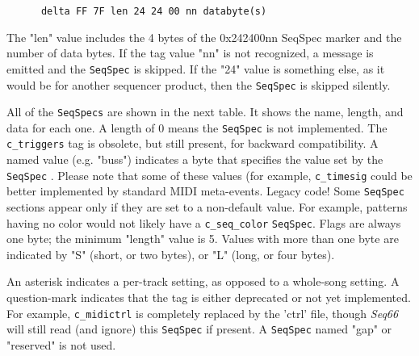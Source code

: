    \begin{verbatim}
      delta FF 7F len 24 24 00 nn databyte(s)
   \end{verbatim}

   The "len" value includes the 4 bytes of the 0x242400nn
   SeqSpec marker and the number of data bytes.
   If the tag value "nn" is not recognized, a message is emitted and the
   \texttt{SeqSpec} is skipped.  If the "24" value is something else, as it
   would be for another sequencer product, then the
   \texttt{SeqSpec} is skipped silently.

   All of the
   \texttt{SeqSpecs} are shown in the next table. It shows the name, length,
   and data for each one. A length of 0 means the
   \texttt{SeqSpec} is not implemented.
   The \texttt{c\_triggers} tag is obsolete, but still present, for
   backward compatibility.
   A named value (e.g. "buss") indicates a byte that specifies the value set by
   the \texttt{SeqSpec} .
   Please note that some of these values (for example, \texttt{c\_timesig}
   could be better implemented by standard MIDI meta-events. Legacy code!
   Some \texttt{SeqSpec} sections appear only if they are set to a non-default
   value.
   For example, patterns having no color would not likely have a
   \texttt{c\_seq\_color} \texttt{SeqSpec}.
   Flags are always one byte; the minimum "length" value is 5.
   Values with more than one byte are indicated by "S" (short, or two bytes),
   or "L" (long, or four bytes).

   An asterisk indicates a per-track setting, as
   opposed to a whole-song setting. A question-mark indicates that the tag is
   either deprecated or not yet implemented.
   For example, \texttt{c\_midictrl} is completely replaced by the
   'ctrl' file, though \textsl{Seq66} will still read (and ignore)
   this \texttt{SeqSpec} if present.
   A \texttt{SeqSpec} named "gap" or "reserved" is not used.


